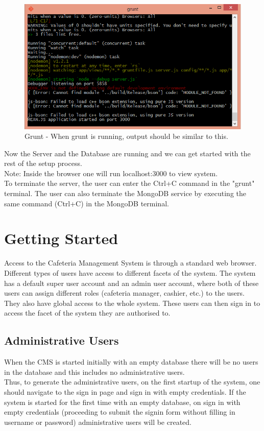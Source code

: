 \documentclass[a4paper,12pt]{report}
\begin{document}
\begin{figure}[H]
  \centering
    \includegraphics[width=1.0\textwidth]{screenshots/gruntOutput.png}
    \caption{Grunt - When grunt is running, output should be similar to this.} 
\end{figure}

Now the Server and the Database are running and we can get started with the rest of the setup process. \\
Note: Inside the browser one will run localhost:3000 to view system. \\ 

To terminate the server, the user can enter the Ctrl+C command in the "grunt" terminal. The user can also terminate the MongoDB service by executing the same command (Ctrl+C) in the MongoDB terminal.

\section{Getting Started}
Access to the Cafeteria Management System is through a standard web browser. Different types of users have access to different facets of the system. The system has a default super user account and an admin user account, where both of these users can assign different roles (cafeteria manager, cashier, etc.) to the users. They also have global access to the whole system. These users can then sign in to access the facet of the system they are authorised to.\\

\subsection{Administrative Users}
When the CMS is started initially with an empty database there will be no users in the database and this includes no administrative users.  \\
Thus, to generate the administrative users, on the first startup of the system, one should navigate to the sign in page and sign in with empty credentials. If the system is started for the first time with an empty database, on sign in with empty credentials (proceeding to submit the signin form without filling in username or password) administrative users will be created. \\
\end{document}
